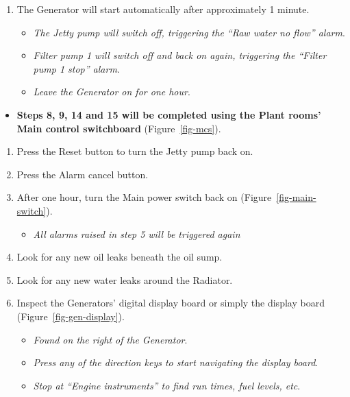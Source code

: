 \documentclass[
  letterpaper,
  DIV=11,
  numbers=noendperiod]{scrreprt}
\providecommand{\tightlist}{%
  \setlength{\itemsep}{0pt}\setlength{\parskip}{0pt}}\usepackage{longtable,booktabs,array}
\begin{document}
\begin{enumerate}
\def\labelenumi{\arabic{enumi}.}
\setcounter{enumi}{6}
\tightlist
\item
  The Generator will start automatically after approximately 1 minute.

  \begin{itemize}
  \tightlist
  \item
    \emph{The Jetty pump will switch off, triggering the ``Raw water no
    flow'' alarm}.
  \item
    \emph{Filter pump 1 will switch off and back on again, triggering
    the ``Filter pump 1 stop'' alarm}.
  \item
    \emph{Leave the Generator on for one hour}.
  \end{itemize}
\end{enumerate}

\begin{itemize}
\tightlist
\item
  \textbf{Steps 8, 9, 14 and 15 will be completed using the Plant rooms'
  Main control switchboard} (Figure~\ref{fig-mcs}).
\end{itemize}

\begin{enumerate}
\def\labelenumi{\arabic{enumi}.}
\setcounter{enumi}{7}
\tightlist
\item
  Press the Reset button to turn the Jetty pump back on.
\item
  Press the Alarm cancel button.
\item
  After one hour, turn the Main power switch back on
  (Figure~\ref{fig-main-switch}).

  \begin{itemize}
  \tightlist
  \item
    \emph{All alarms raised in step 5 will be triggered again}
  \end{itemize}
\item
  Look for any new oil leaks beneath the oil sump.
\item
  Look for any new water leaks around the Radiator.
\item
  Inspect the Generators' digital display board or simply the display
  board (Figure~\ref{fig-gen-display}).

  \begin{itemize}
  \tightlist
  \item
    \emph{Found on the right of the Generator}.
  \item
    \emph{Press any of the direction keys to start navigating the
    display board}.
  \item
    \emph{Stop at ``Engine instruments'' to find run times, fuel levels,
    etc}.
  \end{itemize}
\end{enumerate}
\end{document}
